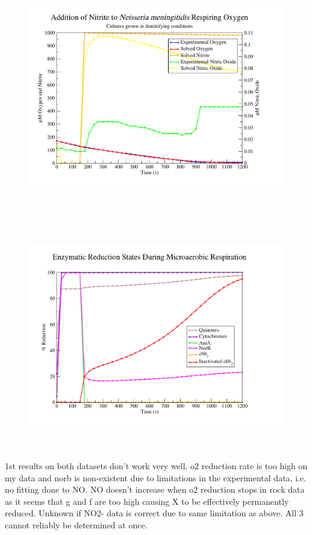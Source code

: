 \begin{figure}[!t]
 \centering
 \includegraphics[height=10cm, trim=1cm 1cm 3cm 1cm, clip=true]{./07-nitritereduction/data/dataset2-1.pdf}
\end{figure}
\begin{figure}[!b]
 \centering
 \includegraphics[height=10cm, trim=1cm 1cm 3cm 1cm, clip=true]{./07-nitritereduction/data/dataset2redox-1.pdf}
\end{figure}




1st results on both datasets don't work very well. o2 reduction rate is too high on my data and norb is non-existent due to limitations in the experimental data, i.e. no fitting done to NO. NO doesn't increase when o2 reduction stops in rock data as it seems that g and f are too high causing X to be effectively permanently reduced. Unknown if NO2- data is correct due to same limitation as above. All 3 cannot reliably be determined at once.

